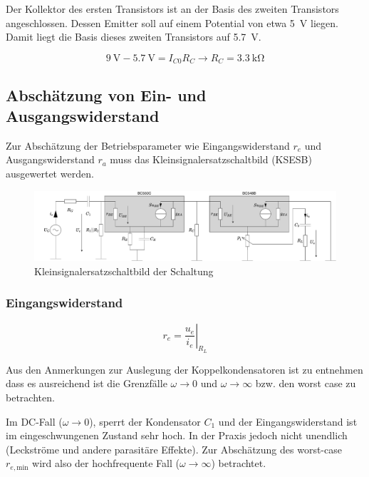 Der Kollektor des ersten Transistors ist an der Basis des zweiten Transistors angeschlossen. Dessen Emitter soll auf einem Potential von etwa \SI{5}{\volt} liegen. Damit liegt die Basis dieses zweiten Transistors auf \SI{5.7}{\volt}.

\begin{equation*}
    \SI{9}{\volt} - \SI{5.7}{\volt} = I_{C0} R_C \rightarrow R_C = \SI{3.3}{\kilo \ohm}
\end{equation*}

\subsection{Abschätzung von Ein- und Ausgangswiderstand}

Zur Abschätzung der Betriebsparameter wie Eingangswiderstand $r_e$ und Ausgangswiderstand $r_a$ muss das Kleinsignalersatzschaltbild (KSESB) ausgewertet werden.

\begin{figure}[H]
    \centering
    \includegraphics[width = \textwidth]{tex/1_Microphone/pictures/KSESB.pdf}
    \caption{Kleinsignalersatzschaltbild der Schaltung}
    \label{fig:my_label}
\end{figure}

\subsubsection{Eingangswiderstand}

\begin{equation*}
    r_e = \left.\frac{u_e}{i_e}\right|_{R_L}
\end{equation*}

Aus den Anmerkungen zur Auslegung der Koppelkondensatoren ist zu entnehmen dass es ausreichend ist die Grenzfälle $\omega \rightarrow 0$ und $\omega \rightarrow \infty$ bzw. den worst case zu betrachten.

Im DC-Fall ($\omega \rightarrow 0$), sperrt der Kondensator $C_1$ und der Eingangswiderstand ist im eingeschwungenen Zustand sehr hoch. In der Praxis jedoch nicht unendlich (Leckströme und andere parasitäre Effekte). Zur Abschätzung des worst-case $r_{e,\text{min}}$ wird also der hochfrequente Fall ($\omega \rightarrow \infty$) betrachtet.

